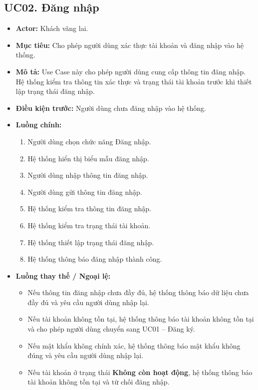 \documentclass[12pt,a4paper]{article}
\begin{document}

\subsection*{UC02. Đăng nhập}

\begin{itemize}
    \item \textbf{Actor:} Khách vãng lai.
    \item \textbf{Mục tiêu:} Cho phép người dùng xác thực tài khoản và đăng nhập vào hệ thống.
    \item \textbf{Mô tả:} Use Case này cho phép người dùng cung cấp thông tin đăng nhập. Hệ thống kiểm tra thông tin xác thực và trạng thái tài khoản trước khi thiết lập trạng thái đăng nhập.
    \item \textbf{Điều kiện trước:} Người dùng chưa đăng nhập vào hệ thống.
    \item \textbf{Luồng chính:}
    \begin{enumerate}
        \item Người dùng chọn chức năng Đăng nhập.
        \item Hệ thống hiển thị biểu mẫu đăng nhập.
        \item Người dùng nhập thông tin đăng nhập.
        \item Người dùng gửi thông tin đăng nhập.
        \item Hệ thống kiểm tra thông tin đăng nhập.
        \item Hệ thống kiểm tra trạng thái tài khoản.
        \item Hệ thống thiết lập trạng thái đăng nhập.
        \item Hệ thống thông báo đăng nhập thành công.
    \end{enumerate}
    \item \textbf{Luồng thay thế / Ngoại lệ:}
    \begin{itemize}
        \item Nếu thông tin đăng nhập chưa đầy đủ, hệ thống thông báo dữ liệu chưa đầy đủ và yêu cầu người dùng nhập lại.
        \item Nếu tài khoản không tồn tại, hệ thống thông báo tài khoản không tồn tại và cho phép người dùng chuyển sang UC01 -- Đăng ký.
        \item Nếu mật khẩu không chính xác, hệ thống thông báo mật khẩu không đúng và yêu cầu người dùng nhập lại.
        \item Nếu tài khoản ở trạng thái \textbf{Không còn hoạt động}, hệ thống thông báo tài khoản không tồn tại và từ chối đăng nhập.

\end{itemize}
\end{itemize}
\end{document}
